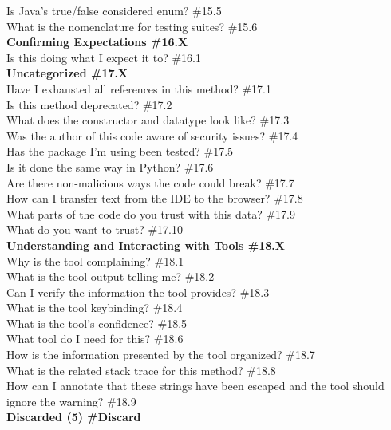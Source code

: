 \documentclass[10pt,journal,compsoc]{IEEEtran}
\begin{document}
	Is Java's true/false considered enum? \#15.5 \\
	What is the nomenclature for testing suites? \#15.6 \\
\textbf{Confirming Expectations  \#16.X} \\
	Is this doing what I expect it to? \#16.1 \\
\textbf{Uncategorized  \#17.X} \\
	Have I exhausted all references in this method? \#17.1 \\
	Is this method deprecated? \#17.2 \\
	What does the constructor and datatype look like? \#17.3 \\
	Was the author of this code aware of security issues? \#17.4 \\
	Has the package I'm using been tested? \#17.5 \\
	Is it done the same way in Python? \#17.6 \\
	Are there non-malicious ways the code could break? \#17.7 \\
	How can I transfer text from the IDE to the browser? \#17.8 \\
	What parts of the code do you trust with this data? \#17.9 \\
	What do you want to trust? \#17.10 \\
\textbf{Understanding and Interacting with Tools \#18.X} \\
	Why is the tool complaining? \#18.1 \\
	What is the tool output telling me?  \#18.2 \\
	Can I verify the information the tool provides? \#18.3 \\
	What is the tool keybinding?  \#18.4 \\
	What is the tool's confidence? \#18.5 \\
	What tool do I need for this?  \#18.6 \\
	How is the information presented by the tool organized?  \#18.7 \\
	What is the related stack trace for this method? \#18.8 \\
	How can I annotate that these strings have been escaped and the tool should ignore the warning? \#18.9 \\
\textbf{Discarded (5) \#Discard}
\end{document}
